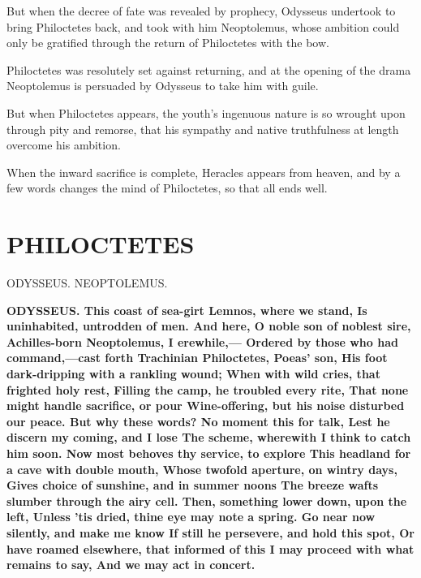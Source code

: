 \documentclass[11pt,letter]{book}
\begin{document}
\par  But when the decree of fate was revealed by prophecy, Odysseus undertook to bring Philoctetes back, and took with him Neoptolemus, whose ambition could only be gratified through the return of Philoctetes with the bow.

\par  Philoctetes was resolutely set against returning, and at the opening of the drama Neoptolemus is persuaded by Odysseus to take him with guile.

\par  But when Philoctetes appears, the youth’s ingenuous nature is so wrought upon through pity and remorse, that his sympathy and native truthfulness at length overcome his ambition.

\par  When the inward sacrifice is complete, Heracles appears from heaven, and by a few words changes the mind of Philoctetes, so that all ends well.

\par  [page 217]
\section{PHILOCTETES}
\par  ODYSSEUS. NEOPTOLEMUS.

\par \textbf{ODYSSEUS. This coast of sea-girt Lemnos, where we stand, Is uninhabited, untrodden of men. And here, O noble son of noblest sire, Achilles-born Neoptolemus, I erewhile,— Ordered by those who had command,—cast forth Trachinian Philoctetes, Poeas’ son, His foot dark-dripping with a rankling wound; When with wild cries, that frighted holy rest, Filling the camp, he troubled every rite, That none might handle sacrifice, or pour Wine-offering, but his noise disturbed our peace. But why these words? No moment this for talk, Lest he discern my coming, and I lose The scheme, wherewith I think to catch him soon. Now most behoves thy service, to explore This headland for a cave with double mouth, Whose twofold aperture, on wintry days, Gives choice of sunshine, and in summer noons The breeze wafts slumber through the airy cell. Then, something lower down, upon the left, Unless ’tis dried, thine eye may note a spring. Go near now silently, and make me know If still he persevere, and hold this spot, Or have roamed elsewhere, that informed of this I may proceed with what remains to say, And we may act in concert.}
\par 
\end{document}
